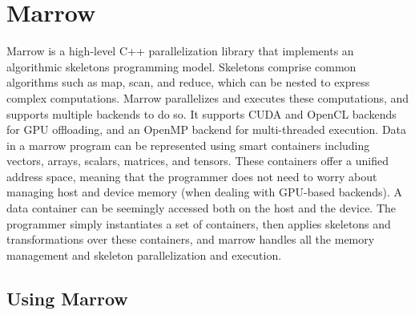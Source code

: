 

\section{Marrow}
\label{sec:marrow}

Marrow is a high-level C++ parallelization library that implements an algorithmic skeletons programming model. Skeletons comprise common algorithms such as map, scan, and reduce, which can be nested to express complex computations. Marrow parallelizes and executes these computations, and supports multiple backends to do so. It supports \gls{CUDA} and OpenCL backends for \gls{GPU} offloading, and an OpenMP backend for multi-threaded execution. Data in a marrow program can be represented using smart containers including vectors, arrays, scalars, matrices, and tensors. These containers offer a unified address space, meaning that the programmer does not need to worry about managing host and device memory (when dealing with \gls{GPU}-based backends). A data container can be seemingly accessed both on the host and the device. The programmer simply instantiates a set of containers, then applies skeletons and transformations over these containers, and marrow handles all the memory management and skeleton parallelization and execution.

\subsection{Using Marrow}


